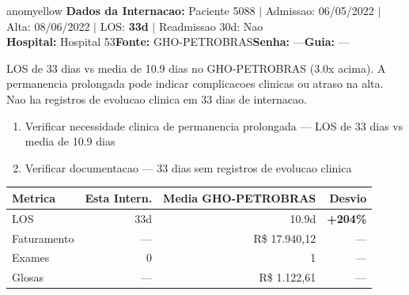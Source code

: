 \documentclass[a4paper,10pt]{article}
\begin{document}
\begin{anomalycard}[Internacao 4774 | GHO-PETROBRAS | MODERADO (z=2.25)]{anomyellow}
\textbf{Dados da Internacao:} Paciente 5088 $\mid$ Admissao: 06/05/2022 $\mid$ Alta: 08/06/2022 $\mid$ LOS: \textbf{33d} $\mid$ Readmissao 30d: Nao\\
\textbf{Hospital:} Hospital 53\quad\textbf{Fonte:} GHO-PETROBRAS\quad\textbf{Senha:} ---\quad\textbf{Guia:} ---\\
\vspace{2pt}\begin{tcolorbox}[colback=severityred!20,colframe=anomyellow,title={\textbf{Interpretacao de Negocio}},fonttitle=\bfseries\small,left=4pt,right=4pt,top=3pt,bottom=3pt]
{\small LOS de 33 dias vs media de 10.9 dias no GHO-PETROBRAS (3.0x acima). A permanencia prolongada pode indicar complicacoes clinicas ou atraso na alta. Nao ha registros de evolucao clinica em 33 dias de internacao.}
\end{tcolorbox}
\begin{tcolorbox}[colback=severityyellow!30,colframe=anomorange,title={\textbf{Recomendacoes Especificas}},fonttitle=\bfseries\small,left=4pt,right=4pt,top=3pt,bottom=3pt]
\begin{enumerate}[nosep,leftmargin=16pt]
\item {\small Verificar necessidade clinica de permanencia prolongada --- LOS de 33 dias vs media de 10.9 dias}
\item {\small Verificar documentacao --- 33 dias sem registros de evolucao clinica}
\end{enumerate}
\end{tcolorbox}
\begin{center}\begin{tabular}{l r r r}\toprule\textbf{Metrica} & \textbf{Esta Intern.} & \textbf{Media GHO-PETROBRAS} & \textbf{Desvio} \\\midrule
LOS & 33d & 10.9d & \textcolor{anomred}{\textbf{+204\%}} \\
Faturamento & --- & R\$ 17.940,12 & --- \\
Exames & 0 & 1 & --- \\
Glosas & --- & R\$ 1.122,61 & --- \\
\bottomrule\end{tabular}\end{center}


\end{anomalycard}
\end{document}
